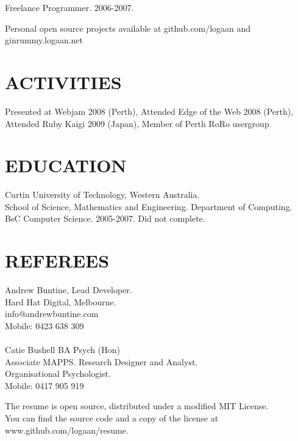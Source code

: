 \documentclass[margin]{res}
\begin{document}
\begin{resume}
  Freelance Programmer. 2006-2007.

  Personal open source projects available at github.com/logaan and ginrummy.logaan.net

  \section{ACTIVITIES}
  Presented at Webjam 2008 (Perth), Attended Edge of the Web 2008 (Perth), Attended
  Ruby Kaigi 2009 (Japan), Member of Perth RoRo usergroup

  \section{EDUCATION}
  Curtin University of Technology, Western Australia. \\
  School of Science, Mathematics and
  Engineering. Department of Computing. \\
  BsC Computer Science. 2005-2007. Did not complete.

  \section{REFEREES}
  Andrew Buntine, Lead Developer. \\
  Hard Hat Digital, Melbourne. \\
  info@andrewbuntine.com \\
  Mobile: 0423 638 309 \\
  \\
  Catie Bushell BA Psych (Hon) \\
  Associate MAPPS. Research Designer and Analyst. \\
  Organisational Psychologist. \\
  Mobile: 0417 905 919 \\

\end{resume} 

\centering
\hspace{-1.75in}  The resume is open source, distributed under a modified MIT License. \\
\hspace{-1.75in}  You can find the source code and a copy of the license at www.github.com/logaan/resume.
\end{document}
